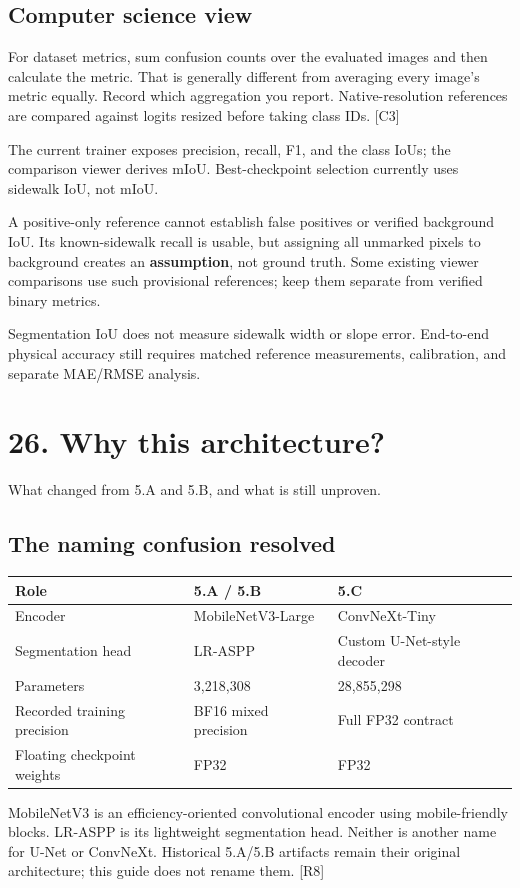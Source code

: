 \documentclass[11pt,letterpaper]{article}
\newcommand{\note}[1]{\par\vspace{3pt}\begingroup\setlength{\fboxsep}{8pt}%
 \colorbox{pale}{\parbox{\dimexpr\linewidth-2\fboxsep\relax}{#1}}\endgroup\par\vspace{3pt}}
\newcommand{\guidepage}[2]{\clearpage\pdfbookmark[0]{#1}{guide-\thepage}\section*{#1}{\sffamily\color{muted}#2}\par\vspace{5pt}}
\begin{document}
\subsection*{Computer science view}
For dataset metrics, sum confusion counts over the evaluated images and then calculate the metric. That is generally different from averaging every image's metric equally. Record which aggregation you report. Native-resolution references are compared against logits resized before taking class IDs. [C3]

The current trainer exposes precision, recall, F1, and the class IoUs; the comparison viewer derives mIoU. Best-checkpoint selection currently uses sidewalk IoU, not mIoU.

\note{A positive-only reference cannot establish false positives or verified background IoU. Its known-sidewalk recall is usable, but assigning all unmarked pixels to background creates an \textbf{assumption}, not ground truth. Some existing viewer comparisons use such provisional references; keep them separate from verified binary metrics.}

{\small Segmentation IoU does not measure sidewalk width or slope error. End-to-end physical accuracy still requires matched reference measurements, calibration, and separate MAE/RMSE analysis.}

\guidepage{26. Why this architecture?}{What changed from 5.A and 5.B, and what is still unproven.}
\subsection*{The naming confusion resolved}
\begin{tabularx}{\linewidth}{@{}YYY@{}}\toprule
\textbf{Role} & \textbf{5.A / 5.B} & \textbf{5.C}\\\midrule
Encoder & MobileNetV3-Large & ConvNeXt-Tiny\\
Segmentation head & LR-ASPP & Custom U-Net-style decoder\\
Parameters & 3,218,308 & 28,855,298\\
Recorded training precision & BF16 mixed precision & Full FP32 contract\\
Floating checkpoint weights & FP32 & FP32\\\bottomrule
\end{tabularx}

MobileNetV3 is an efficiency-oriented convolutional encoder using mobile-friendly blocks. LR-ASPP is its lightweight segmentation head. Neither is another name for U-Net or ConvNeXt. Historical 5.A/5.B artifacts remain their original architecture; this guide does not rename them. [R8]
\end{document}
